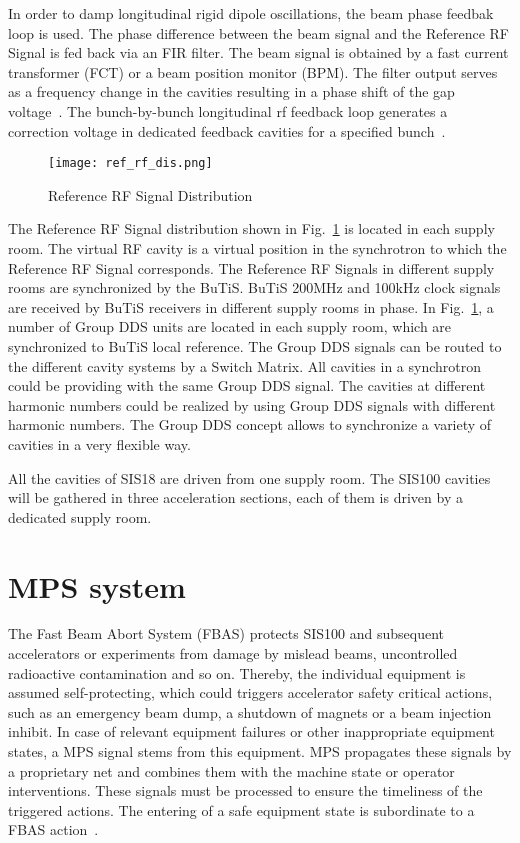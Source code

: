 In order to damp longitudinal rigid dipole oscillations, the beam phase feedbak loop is used. The phase difference between the beam signal and the Reference RF Signal is fed back via an FIR filter. The beam signal is obtained by a fast current transformer (FCT) or a beam position monitor (BPM). The filter output serves as a frequency change in the cavities resulting in a phase shift of the gap voltage~\cite{baudrenghien_low-level_2010}. The bunch-by-bunch longitudinal rf feedback loop generates a correction voltage in dedicated feedback cavities for a specified bunch~\cite{gros_s_bunch-by-bunch_2015}.


\begin{figure}[H]
   \centering   
   \texttt{[image: ref\_rf\_dis.png]}
   \caption{Reference RF Signal Distribution}
   \label{ref_rf_dis}
\end{figure}
The Reference RF Signal distribution shown in Fig.~\ref{ref_rf_dis} is located in each supply room. The virtual RF cavity is a virtual position in the synchrotron to which the Reference RF Signal corresponds. The Reference RF Signals in different supply rooms are synchronized by the BuTiS. BuTiS 200MHz and 100kHz clock signals are received by BuTiS receivers in different supply rooms in phase. In Fig.~\ref{ref_rf_dis}, a number of Group DDS units are located in each supply room, which are synchronized to BuTiS local reference. The Group DDS signals can be routed to the different cavity systems by a Switch Matrix. All cavities in a synchrotron could be providing with the same Group DDS signal. The cavities at different harmonic numbers could be realized by using Group DDS signals with different harmonic numbers. The Group DDS concept allows to synchronize a variety of cavities in a very flexible way. 

All the cavities of SIS18 are driven from one supply room. The SIS100 cavities will be gathered in three acceleration sections, each of them is driven by a dedicated supply room. 

\section{\gls{MPS} system}
The Fast Beam Abort System (FBAS) protects SIS100 and subsequent accelerators or experiments from damage by mislead beams, uncontrolled radioactive contamination and so on. Thereby, the individual equipment is assumed self-protecting, which could triggers accelerator safety critical actions, such as an emergency beam dump, a shutdown of magnets or a beam injection
inhibit. In case of relevant equipment failures or other inappropriate equipment states, a MPS signal stems from this equipment. MPS propagates these signals by a proprietary net and combines them with the machine state or operator interventions. These signals must be processed to ensure the timeliness of the triggered actions. The entering of a safe equipment state is subordinate to a FBAS action~\cite{Marku_fair_FBAS}.



